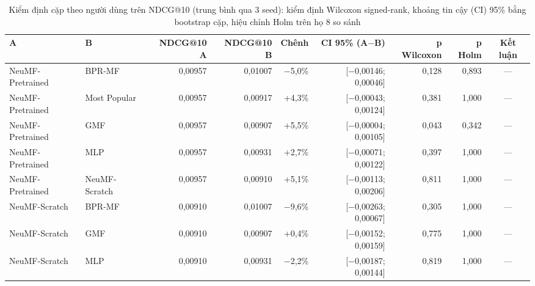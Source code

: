 \begin{table}[htbp]
    \centering\small
    \caption{Kiểm định cặp theo người dùng trên NDCG@10 (trung bình qua 3 seed): kiểm định Wilcoxon signed-rank, khoảng tin cậy (CI) 95\% bằng bootstrap cặp, hiệu chỉnh Holm trên họ 8 so sánh}
    \label{tab:significance}
    \begin{adjustbox}{max width=\textwidth}
    \begin{tabular}{llrrrrrrc}
        \toprule
        A & B & NDCG@10 A & NDCG@10 B & Chênh & CI 95\% (A$-$B) & p Wilcoxon & p Holm & Kết luận \\
        \midrule
        NeuMF-Pretrained & BPR-MF & 0{,}00957 & 0{,}01007 & $-$5{,}0\% & [$-$0{,}00146; 0{,}00046] & 0{,}128 & 0{,}893 & --- \\
        NeuMF-Pretrained & Most Popular & 0{,}00957 & 0{,}00917 & +4{,}3\% & [$-$0{,}00043; 0{,}00124] & 0{,}381 & 1{,}000 & --- \\
        NeuMF-Pretrained & GMF & 0{,}00957 & 0{,}00907 & +5{,}5\% & [$-$0{,}00004; 0{,}00105] & 0{,}043 & 0{,}342 & --- \\
        NeuMF-Pretrained & MLP & 0{,}00957 & 0{,}00931 & +2{,}7\% & [$-$0{,}00071; 0{,}00122] & 0{,}397 & 1{,}000 & --- \\
        NeuMF-Pretrained & NeuMF-Scratch & 0{,}00957 & 0{,}00910 & +5{,}1\% & [$-$0{,}00113; 0{,}00206] & 0{,}811 & 1{,}000 & --- \\
        NeuMF-Scratch & BPR-MF & 0{,}00910 & 0{,}01007 & $-$9{,}6\% & [$-$0{,}00263; 0{,}00067] & 0{,}305 & 1{,}000 & --- \\
        NeuMF-Scratch & GMF & 0{,}00910 & 0{,}00907 & +0{,}4\% & [$-$0{,}00152; 0{,}00159] & 0{,}775 & 1{,}000 & --- \\
        NeuMF-Scratch & MLP & 0{,}00910 & 0{,}00931 & $-$2{,}2\% & [$-$0{,}00187; 0{,}00144] & 0{,}819 & 1{,}000 & --- \\
        \bottomrule
    \end{tabular}
    \end{adjustbox}
    \par{}
\end{table}
